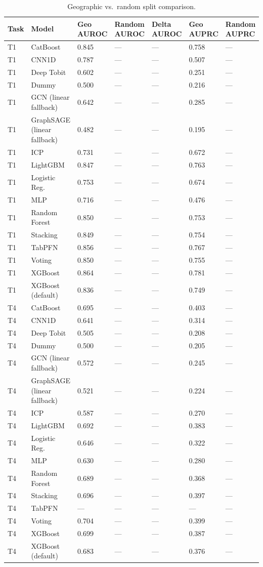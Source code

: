 \begin{table}
\caption{Geographic vs.\ random split comparison.}
\label{tab:splits}
\begin{tabular}{lllllll}
\toprule
Task & Model & Geo AUROC & Random AUROC & Delta AUROC & Geo AUPRC & Random AUPRC \\
\midrule
T1 & CatBoost & 0.845 & — & — & 0.758 & — \\
T1 & CNN1D & 0.787 & — & — & 0.507 & — \\
T1 & Deep Tobit & 0.602 & — & — & 0.251 & — \\
T1 & Dummy & 0.500 & — & — & 0.216 & — \\
T1 & GCN (linear fallback) & 0.642 & — & — & 0.285 & — \\
T1 & GraphSAGE (linear fallback) & 0.482 & — & — & 0.195 & — \\
T1 & ICP & 0.731 & — & — & 0.672 & — \\
T1 & LightGBM & 0.847 & — & — & 0.763 & — \\
T1 & Logistic Reg. & 0.753 & — & — & 0.674 & — \\
T1 & MLP & 0.716 & — & — & 0.476 & — \\
T1 & Random Forest & 0.850 & — & — & 0.753 & — \\
T1 & Stacking & 0.849 & — & — & 0.754 & — \\
T1 & TabPFN & 0.856 & — & — & 0.767 & — \\
T1 & Voting & 0.850 & — & — & 0.755 & — \\
T1 & XGBoost & 0.864 & — & — & 0.781 & — \\
T1 & XGBoost (default) & 0.836 & — & — & 0.749 & — \\
T4 & CatBoost & 0.695 & — & — & 0.403 & — \\
T4 & CNN1D & 0.641 & — & — & 0.314 & — \\
T4 & Deep Tobit & 0.505 & — & — & 0.208 & — \\
T4 & Dummy & 0.500 & — & — & 0.205 & — \\
T4 & GCN (linear fallback) & 0.572 & — & — & 0.245 & — \\
T4 & GraphSAGE (linear fallback) & 0.521 & — & — & 0.224 & — \\
T4 & ICP & 0.587 & — & — & 0.270 & — \\
T4 & LightGBM & 0.692 & — & — & 0.383 & — \\
T4 & Logistic Reg. & 0.646 & — & — & 0.322 & — \\
T4 & MLP & 0.630 & — & — & 0.280 & — \\
T4 & Random Forest & 0.689 & — & — & 0.368 & — \\
T4 & Stacking & 0.696 & — & — & 0.397 & — \\
T4 & TabPFN & — & — & — & — & — \\
T4 & Voting & 0.704 & — & — & 0.399 & — \\
T4 & XGBoost & 0.699 & — & — & 0.387 & — \\
T4 & XGBoost (default) & 0.683 & — & — & 0.376 & — \\
\bottomrule
\end{tabular}
\end{table}
